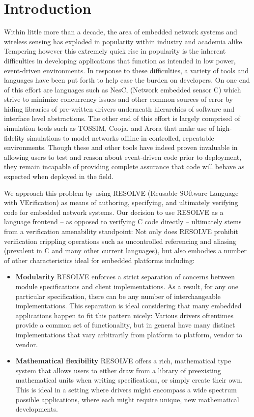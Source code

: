 \documentclass{sig-alternate}
\begin{document}
\section{Introduction}
\label{sec:intro}
Within little more than a decade, the area of embedded network systems and wireless sensing has exploded in popularity within industry and academia alike. Tempering however this extremely quick rise in popularity is the inherent difficulties in developing applications that function as intended in low power, event-driven environments. In response to these difficulties, a variety of tools and languages have been put forth  to help ease the burden on developers. On one end of this effort are languages such as NesC, (Network embedded sensor C) which strive to minimize concurrency issues and other common sources of error by hiding libraries of pre-written drivers underneath hierarchies of software and interface level abstractions. The other end of this effort is largely comprised of simulation tools such as TOSSIM, Cooja, and Arora that make use of high-fidelity simulations to model networks offline in controlled, repeatable environments. Though these and other tools have indeed proven invaluable in allowing users to test and reason about event-driven code prior to deployment, they remain incapable of providing complete assurance that code will behave as expected when deployed in the field.

We approach this problem by using RESOLVE (Reusable SOftware Language with VErification) as means of authoring, specifying, and ultimately verifying code for embedded network systems. Our decision to use RESOLVE as a language frontend -- as opposed to verifying C code directly -- ultimately stems from a verification amenability standpoint: Not only does RESOLVE prohibit verification crippling operations such as uncontrolled referencing and aliasing (prevalent in C and many other current languages)\cite{kulczycki:2004}, but also embodies a number of other characteristics ideal for embedded platforms including:

\begin{itemize}
\item \textbf{Modularity} RESOLVE enforces a strict separation of concerns between module specifications and client implementations. As a result, for any one particular specification, there can be any number of interchangeable implementations. This separation is ideal considering that many embedded applications happen to fit this pattern nicely: Various drivers oftentimes provide a common set of functionality, but in general have many distinct implementations that vary arbitrarily from platform to platform, vendor to vendor.

\item \textbf{Mathematical flexibility} RESOLVE offers a rich, mathematical type system that allows users to either draw from a library of preexisting mathematical units when writing specifications, or simply create their own. This is ideal in a setting where drivers might encompass a wide spectrum possible applications, where each might require unique, new mathematical developments.%

\end{itemize}
\end{document}
